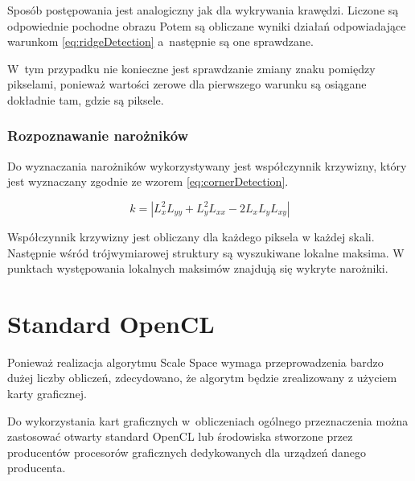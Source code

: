 Sposób postępowania jest analogiczny jak dla wykrywania krawędzi. Liczone są odpowiednie pochodne obrazu
Potem są obliczane wyniki działań odpowiadające warunkom \eqref{eq:ridgeDetection} a~następnie są one sprawdzane.

W~tym przypadku nie konieczne jest sprawdzanie zmiany znaku pomiędzy pikselami, ponieważ wartości zerowe dla pierwszego warunku są osiągane dokładnie tam, gdzie są piksele. 

\subsubsection{Rozpoznawanie narożników}
\label{subsubsec:rozpoznawanieNaroznikow}

Do wyznaczania narożników wykorzystywany jest współczynnik krzywizny, który jest wyznaczany zgodnie ze wzorem \eqref{eq:cornerDetection}.

\begin{equation}
\label{eq:cornerDetection}
k = |L_x^2L_{yy}  + L_y^2L_{xx} - 2L_xL_yL_{xy}|
\end{equation}

Współczynnik krzywizny jest obliczany dla każdego piksela w każdej skali. Następnie wśród trójwymiarowej struktury są wyszukiwane lokalne maksima. W punktach występowania lokalnych maksimów znajdują się wykryte narożniki.


\section{Standard OpenCL}
\label{sec:OpenCL}

Ponieważ realizacja algorytmu Scale Space wymaga przeprowadzenia bardzo dużej liczby obliczeń, zdecydowano, że algorytm będzie zrealizowany z użyciem karty graficznej.

Do wykorzystania kart graficznych w~obliczeniach ogólnego przeznaczenia można zastosować otwarty standard OpenCL lub środowiska stworzone przez producentów procesorów graficznych dedykowanych dla urządzeń danego producenta.

